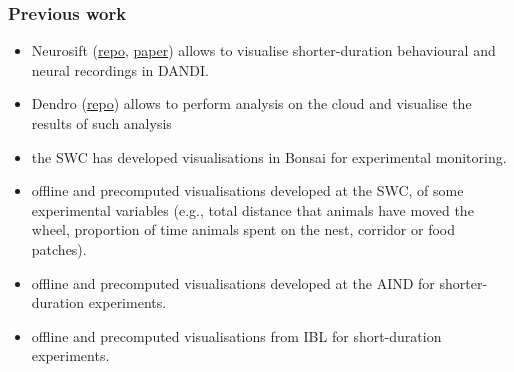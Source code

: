 \begin{frame}
    \frametitle{Previous work}

    \begin{itemize}

        \item Neurosift
            (\href{https://github.com/flatironinstitute/neurosift}{repo},
            \href{https://joss.theoj.org/papers/10.21105/joss.06590}{paper}) allows to
        visualise shorter-duration behavioural and neural recordings in DANDI.

        \item Dendro (\href{https://github.com/magland/dendro}{repo}) allows to
        perform analysis on the cloud and visualise the results of such analysis

        \item the SWC has developed visualisations in Bonsai for experimental
        monitoring.

        \item offline and precomputed visualisations developed at the SWC, of some
        experimental variables (e.g., total distance that animals have moved the
        wheel, proportion of time animals spent on the nest, corridor or food
        patches).

        \item offline and precomputed visualisations developed at the AIND for
        shorter-duration experiments.

        \item offline and precomputed visualisations from IBL for short-duration
        experiments.

    \end{itemize}

\end{frame}


